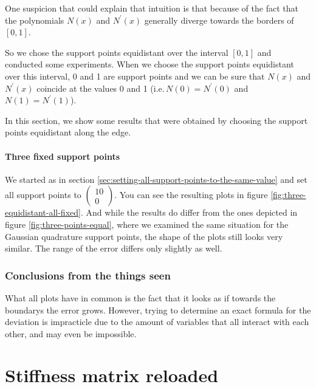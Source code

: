 \documentclass{article}
\begin{document}
One suspicion that could explain that intuition is that because of the fact that the polynomials $N\left(x\right)$ and $N^\prime\left(x\right)$ generally diverge towards the borders of $[0,1]$.

So we chose the support points equidistant over the interval $[0,1]$ and conducted some experiments. When we choose the support points equidistant over this interval, 0 and 1 are support points and we can be sure that $N\left(x\right)$ and $N^\prime\left(x\right)$ coincide at the values 0 and 1 (i.e.\,$N\left(0\right)=N^\prime\left(0\right)$ and $N\left(1\right)=N^\prime\left(1\right)$).

In this section, we show some results that were obtained by choosing the support points equidistant along the edge.

\subsection{Three fixed support points}
\label{sec:equidistant-three-fixed}

We started as in section \ref{sec:setting-all-support-points-to-the-same-value} and set all support points to $
\begin{pmatrix}
  10 \\ 0
\end{pmatrix}$. You can see the resulting plots in figure \ref{fig:three-equidistant-all-fixed}. And while the results do differ from the ones depicted in figure \ref{fig:three-points-equal}, where we examined the same situation for the Gaussian quadrature support points, the shape of the plots still looks very similar. The range of the error differs only slightly as well.



\section{Conclusions from the things seen}
\label{sec:conslusions}

What all plots have in common is the fact that it looks as if towards the boundarys the error grows. However, trying to determine an exact formula for the deviation is impracticle due to the amount of variables that all interact with each other, and may even be impossible.

\clearpage{}

\part{Stiffness matrix reloaded}
\label{part:stiffness-matrix}
\end{document}
